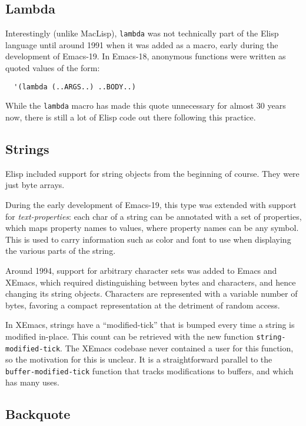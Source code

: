 \documentclass[format=acmsmall, review=false, screen=true]{acmart}
\newcommand \Elisp {Elisp}
\begin{document}
\subsection{Lambda}
\label{sec:lambda}

Interestingly (unlike MacLisp), \texttt{lambda} was not technically part of the \Elisp{}
language until around 1991 when it was added as a macro, early during the
development of Emacs-19.  In Emacs-18, anonymous functions were written
as quoted values of the form:
\begin{verbatim}
  '(lambda (..ARGS..) ..BODY..)
\end{verbatim}
While the \texttt{lambda} macro has made this quote unnecessary for almost
30 years now, there is still a lot of \Elisp{} code out there following
this practice.

\subsection{Strings}
\label{sec:strings}

\Elisp{} included support for string objects from the beginning of course.
They were just byte arrays.

During the early development of Emacs-19, this type was extended with
support for \emph{text-properties}: each char of a string can be annotated
with a set of properties, which maps property names to values, where property
names can be any symbol.  This is used to carry information such as color
and font to use when displaying the various parts of the string.

Around 1994, support for arbitrary character sets was added to Emacs and
XEmacs, which required distinguishing between bytes and characters, and
hence changing its string objects.  Characters are represented with
a variable number of bytes, favoring a compact representation at the
detriment of random access.

In XEmacs, strings have a ``modified-tick'' that is bumped every time
a string is modified in-place.  This count can be retrieved with the
new function \texttt{string-modified-tick}.  The XEmacs codebase never
contained a user for this function, so the motivation for this is
unclear.  It is a straightforward parallel to the
\texttt{buffer-modified-tick} function that tracks modifications to
buffers, and which has many uses.


\subsection{Backquote}
\label{sec:backquote}
\end{document}
